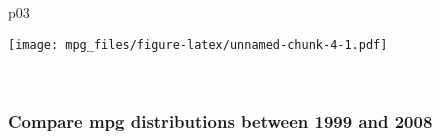 \documentclass[
]{article}
\newenvironment{Shaded}{\begin{snugshade}}{\end{snugshade}}
\newcommand{\NormalTok}[1]{#1}
\begin{document}
\begin{Shaded}
\begin{Highlighting}[]
\NormalTok{p03}
\end{Highlighting}
\end{Shaded}

\texttt{[image: mpg\_files/figure-latex/unnamed-chunk-4-1.pdf]}\\
\strut \\

\hypertarget{compare-mpg-distributions-between-1999-and-2008}{%
\subsubsection{\texorpdfstring{\textbf{Compare mpg distributions between
1999 and
2008}}{Compare mpg distributions between 1999 and 2008}}\label{compare-mpg-distributions-between-1999-and-2008}}
\end{document}
